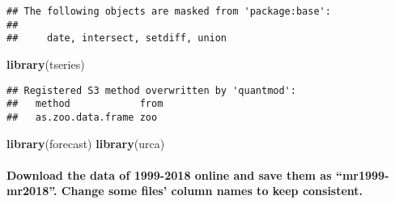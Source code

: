 \documentclass[]{article}
\newenvironment{Shaded}{\begin{snugshade}}{\end{snugshade}}
\newcommand{\KeywordTok}[1]{\textcolor[rgb]{0.13,0.29,0.53}{\textbf{#1}}}
\newcommand{\NormalTok}[1]{#1}
\let\oldparagraph\paragraph
\renewcommand{\paragraph}[1]{\oldparagraph{#1}\mbox{}}
\begin{document}
\begin{verbatim}
## The following objects are masked from 'package:base':
## 
##     date, intersect, setdiff, union
\end{verbatim}

\begin{Shaded}
\begin{Highlighting}[]
\KeywordTok{library}\NormalTok{(tseries)}
\end{Highlighting}
\end{Shaded}

\begin{verbatim}
## Registered S3 method overwritten by 'quantmod':
##   method            from
##   as.zoo.data.frame zoo
\end{verbatim}

\begin{Shaded}
\begin{Highlighting}[]
\KeywordTok{library}\NormalTok{(forecast)}
\KeywordTok{library}\NormalTok{(urca)}
\end{Highlighting}
\end{Shaded}

\hypertarget{download-the-data-of-1999-2018-online-and-save-them-as-mr1999-mr2018.-change-some-files-column-names-to-keep-consistent.}{%
\paragraph{Download the data of 1999-2018 online and save them as
``mr1999-mr2018''. Change some files' column names to keep
consistent.}\label{download-the-data-of-1999-2018-online-and-save-them-as-mr1999-mr2018.-change-some-files-column-names-to-keep-consistent.}}
\end{document}

